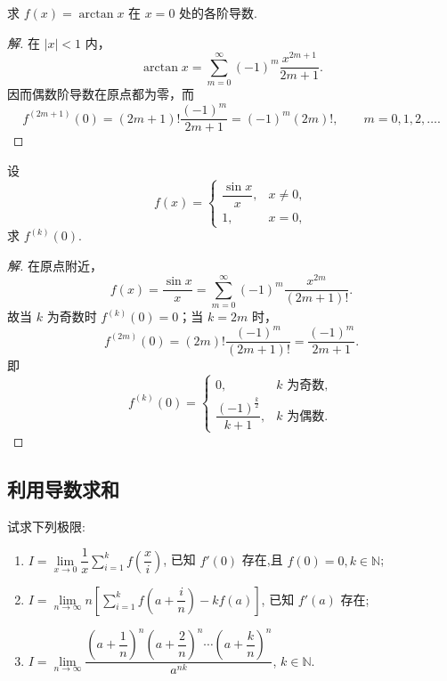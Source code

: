 \documentclass[../../数学分析培优讲义(答案版).tex]{subfiles}
\begin{document}

\begin{example}
求 $f(x)=\arctan x$ 在 $x=0$ 处的各阶导数.
\end{example}

\begin{proof}[解]
在 $|x|<1$ 内，
\[
    \arctan x
    =\sum\limits_{m=0}^{\infty}(-1)^m\dfrac{x^{2m+1}}{2m+1}.
\]
因而偶数阶导数在原点都为零，而
\[
    f^{(2m+1)}(0)
    =(2m+1)!\dfrac{(-1)^m}{2m+1}
    =(-1)^m(2m)!,
    \qquad m=0,1,2,\ldots.
\]
\end{proof}

\begin{example}
设
\[
f(x)=
\begin{cases}
    \dfrac{\sin x}{x}, & x\neq0,\\
    1, & x=0,
\end{cases}
\]
求 $f^{(k)}(0)$.
\end{example}

\begin{proof}[解]
在原点附近，
\[
    f(x)=\dfrac{\sin x}{x}
    =\sum\limits_{m=0}^{\infty}(-1)^m\dfrac{x^{2m}}{(2m+1)!}.
\]
故当 $k$ 为奇数时 $f^{(k)}(0)=0$；当 $k=2m$ 时，
\[
    f^{(2m)}(0)
    =(2m)!\dfrac{(-1)^m}{(2m+1)!}
    =\dfrac{(-1)^m}{2m+1}.
\]
即
\[
    f^{(k)}(0)=
    \begin{cases}
        0, & k\text{ 为奇数},\\
        \dfrac{(-1)^{\frac{k}{2}}}{k+1}, & k\text{ 为偶数}.
    \end{cases}
\]
\end{proof}

\subsection{利用导数求和}

\begin{example}
试求下列极限:
\begin{enumerate}[label=(\arabic*)]
    \item $\displaystyle
    I=\lim\limits_{x\to0}\dfrac{1}{x}\sum\limits_{i=1}^k f\left(\dfrac{x}{i}\right)$,
    已知 $f'(0)$ 存在,且 $f(0)=0,k\in\mathbb{N}$;
    \item $\displaystyle
    I=\lim\limits_{n\to\infty}n\left[\sum\limits_{i=1}^k f\left(a+\dfrac{i}{n}\right)-kf(a)\right]$,
    已知 $f'(a)$ 存在;
    \item $\displaystyle
    I=\lim\limits_{n\to\infty}
    \dfrac{\left(a+\dfrac{1}{n}\right)^n\left(a+\dfrac{2}{n}\right)^n\cdots\left(a+\dfrac{k}{n}\right)^n}{a^{nk}}$,
    $k\in\mathbb{N}$.
\end{enumerate}
\end{example}
\end{document}
